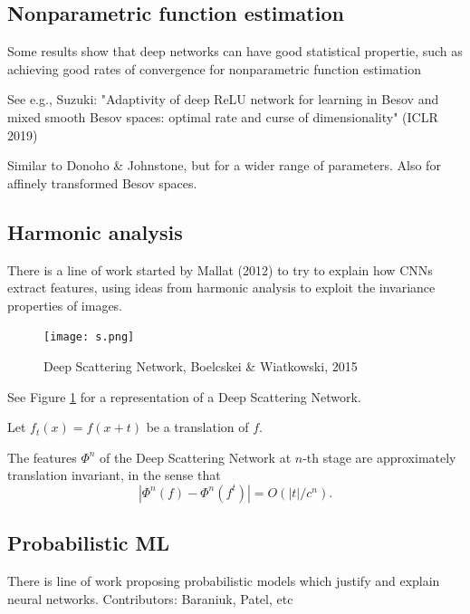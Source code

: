 \documentclass[english]{article}
\begin{document}
\subsection{Nonparametric function estimation}


\benum
\item Some results show that deep networks can have good statistical propertie, such as achieving good rates of convergence for nonparametric function estimation

See e.g., Suzuki: "Adaptivity of deep ReLU network for learning in Besov and mixed smooth Besov spaces: optimal rate and curse of dimensionality" (ICLR 2019)

Similar to Donoho \& Johnstone, but for a wider range of parameters. Also for affinely transformed Besov spaces.

\eenum 

\subsection{Harmonic analysis}

There is a line of work started by Mallat (2012) to try to explain how CNNs extract features, using ideas from harmonic analysis to exploit the invariance properties of images. 

\begin{figure}
  \centering
  \texttt{[image: s.png]}
  \caption{Deep Scattering Network, Boelcskei \& Wiatkowski, 2015}
  \label{dsn}
\end{figure}

See Figure \ref{dsn} for a representation of a Deep Scattering Network. 


\begin{theorem}
Let $f_t(x) = f(x+t)$ be a translation of $f$. 

The features $\Phi^n$ of the Deep Scattering Network at $n$-th stage are approximately translation invariant, in the sense that $$|\Phi^n(f) - \Phi^n(f^t)| = O(|t|/c^n).$$
\end{theorem}
%
%
%

\subsection{Probabilistic ML}

There is line of work proposing probabilistic models which justify and explain neural networks.  Contributors: Baraniuk, Patel, etc
\end{document}
